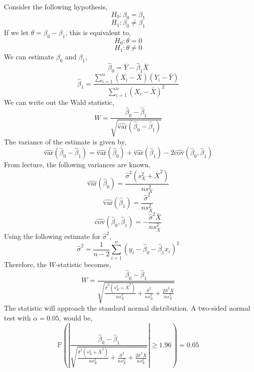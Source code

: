 \documentclass[12pt,twoside]{article}
\begin{document}
\begin{problems}
Consider the following hypothesis,
$$ H_0 : \beta_0 = \beta_1 $$
$$ H_1 : \beta_0 \neq \beta_1 $$
If we let $\theta = \beta_0 - \beta_1$, this is equivalent to,
$$ H_0 : \theta = 0 $$
$$ H_1 : \theta \neq 0 $$
We can estimate $\beta_0$ and $\beta_1$,
$$ \hat{\beta}_0 = \bar{Y} - \hat{\beta}_1 \bar{X} $$
$$ \hat{\beta}_1 = \frac{\sum_{i = 1}^n (X_i - \bar{X})(Y_i -
\bar{Y})}{\sum_{i = 1}^n (X_i - \bar{X})^2} $$
We can write out the Wald statistic,
$$ W = \frac{\hat{\beta}_0 -
\hat{\beta}_1}{\sqrt{\hat{\mathrm{var}}(\hat{\beta}_0 - \hat{\beta}_1)}} $$
The variance of the estimate is given by,
$$ \hat{\mathrm{var}}(\hat{\beta}_0 - \hat{\beta}_1) =
\hat{\mathrm{var}}(\hat{\beta}_0) + \hat{\mathrm{var}}(\hat{\beta}_1) - 2
\hat{\mathrm{cov}}(\hat{\beta}_0, \hat{\beta}_1) $$
From lecture, the following variances are known,
$$ \hat{\mathrm{var}}(\hat{\beta}_0) = \frac{\hat{\sigma}^2(s_X^2 +
\bar{X}^2)}{n s_X^2} $$
$$ \hat{\mathrm{var}}(\hat{\beta}_1) = \frac{\hat{\sigma}^2}{n s_X^2} $$
$$ \hat{\mathrm{cov}}(\hat{\beta}_0, \hat{\beta}_1) = - \frac{\hat{\sigma}^2
\bar{X}}{n s_X^2} $$
Using the following estimate for $\hat{\sigma}^2$,
$$ \hat{\sigma}^2 = \frac{1}{n - 2} \sum_{i = 1}^n (y_i - \hat{\beta}_0 -
\hat{\beta}_1 x_i)^2 $$
Therefore, the $W$-statistic becomes,
$$ W = \frac{\hat{\beta}_0 - \hat{\beta}_1}{\sqrt{\frac{\hat{\sigma}^2(s_X^2
+ \bar{X}^2)}{n s_X^2} + \frac{\hat{\sigma}^2}{n s_X^2} + \frac{2
\hat{\sigma}^2 \bar{X}}{n s_X^2}}} $$
The statistic will approach the standard normal distribution. A two-sided
normal test with $\alpha = 0.05$, would be,
$$ \mathbb{P}\left(\left|\frac{\hat{\beta}_0 -
\hat{\beta}_1}{\sqrt{\frac{\hat{\sigma}^2(s_X^2 + \bar{X}^2)}{n s_X^2} +
\frac{\hat{\sigma}^2}{n s_X^2} + \frac{2 \hat{\sigma}^2 \bar{X}}{n
s_X^2}}}\right| \geq 1.96\right) = 0.05 $$

\end{problems}
\end{document}
